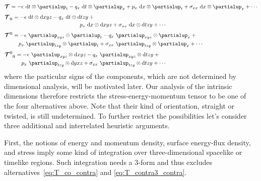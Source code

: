 \documentclass[\ifafour a4paper,12pt,\else a5paper,10pt,\fi%
onecolumn,oneside,article,%
british%
]{memoir}
\makeatletter
\theoremstyle{remark}
\theoremstyle{innote}
\newcommand*{\de}{\partialup}%
\newcommand*{\di}{\mathrm{d}}%
\renewcommand*{\|}[1][]{\nonscript\,#1\vert\nonscript\;\mathopen{}}
\newcommand*{\q}{}%
\DeclareRobustCommand*{\q}{%
  \mathord{\mathpalette\bigcdot@{}}%
}
\newcommand*{\bigcdot@scalefactor}{0.7}
\newcommand*{\bigcdot@widthfactor}{1.5}
\newcommand*{\bigcdot@}[2]{%
  \sbox0{$#1\vcenter{}$}%
  \sbox2{$#1\cdot\m@th$}%
  \hbox to \bigcdot@widthfactor\wd2{%
    \hfil
    \raise\ht0\hbox{%
      \scalebox{\bigcdot@scalefactor}{%
        \lower\ht0\hbox{$#1\bullet\m@th$}%
      }%
    }%
    \hfil
  }%
}
\newcommand*{\yT}{\bm{\mathcal{T}}}
\renewcommand*{\i}{\indices}
\newcommand*{\en}{\epsilon}
\newcommand*{\yq}{q}
\newcommand*{\yp}{p}
\newcommand*{\yt}{\sigma}
\newcommand*{\rul}{{\mkern2mu\rule[-0.1ex]{0.75pt}{1.1ex}\mkern2mu}}
\DeclarePairedDelimiter\mul{\rul}{\rul}%
\makeatother
\begin{document}
\begin{subequations}
  \label{eq:T_alternatives}
  \begin{align}
    \label{eq:T_co_contra}
    &\yT\i{_{\q}^{\q}} = -\en\  \di t\otimes\de_{t} 
      -\yq_{x}\  \di t\otimes\de_{x} +
      \yp_{x}\  \di x\otimes\de_{t} +
      \yt_{x x}\  \di x\otimes\de_{x} + \dotsb
    \\[\jot]
    \label{eq:T_co_co3}
    &\!\begin{multlined}[b][0.85\textwidth]
      \yT\i{_{\q\mul{\q\q\q}}} =
      -\en\  \di t\otimes\di xyz 
      -\yq_{x}\  \di t\otimes\di tzy +{}\\
      \yp_{x}\  \di x\otimes\di xyz 
      +\yt_{x x}\  \di x\otimes\di tzy + \dotsb
    \end{multlined}
    \\[\jot]
    \label{eq:T_contra3_contra}
    &\!\begin{multlined}[b][0.85\textwidth]
      \yT\i{^{\mul{\q\q\q}\q}} = -\en\  \de_{xyz} \otimes\de_{t} 
      -\yq_{x}\  \de_{xyz}\otimes\de_{x} +{}\\
      \yp_{x}\  \de_{tzy} \otimes\de_{t} +
      \yt_{x x}\  \de_{tzy}\otimes\de_{x} + \dotsb
    \end{multlined}
    \\[\jot]
    \label{eq:T_contra3_co3}
    &\!\begin{multlined}[b][0.85\textwidth]
      \yT\i{^{\mul{\q\q\q}}_{\mul{\q\q\q}}} = -\en\  \de_{xyz} \otimes\di xyz 
      -\yq_{x}\  \de_{xyz}\otimes\di tzy +{}\\
      \yp_{x}\  \de_{tzy} \otimes\di yxz 
      + \yt_{x x}\  \de_{tzy}\otimes\di tzy
      + \dotsb
    \end{multlined}
  \end{align}
\end{subequations}
where the particular signs of the components, which are not determined by
dimensional analysis, will be motivated later. Our analysis of the
intrinsic dimensions therefore restricts the stress-energy-momentum tensor
to be one of the four alternatives above. Note that their kind of
orientation, straight or twisted, is still undetermined. To further
restrict the possibilities let's consider three additional and interrelated
heuristic arguments.

First, the notions of energy and momentum density, surface energy-flux
density, and stress imply some kind of integration over three-dimensional
spacelike or timelike regions. Such integration needs a 3-form and thus
excludes alternatives~\eqref{eq:T_co_contra} and
\eqref{eq:T_contra3_contra}.
\end{document}
